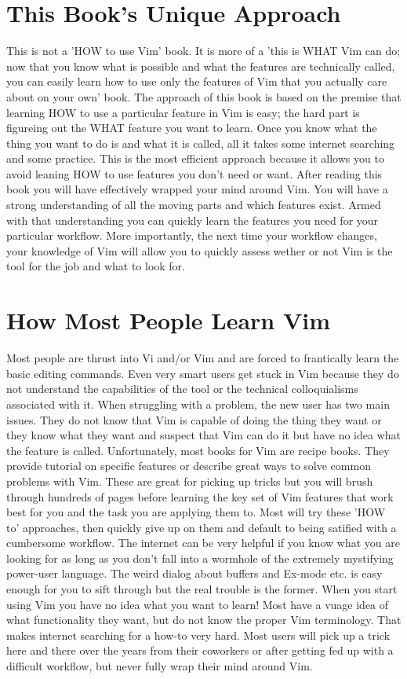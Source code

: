\documentclass[12pt]{book}
\begin{document}
\section{This Book's Unique Approach}
This is not a 'HOW to use Vim' book.
It is more of a 'this is WHAT Vim can do; now that you know what is possible and what the features are technically called, you can easily learn how to use only the features of Vim
that you actually care about on your own' book.
The approach of this book is based on the premise that learning HOW to use a particular feature in Vim is easy; the hard part is figureing out the WHAT feature you want to learn.
Once you know what the thing you want to do is and what it is called, all it takes some internet searching and some practice.
This is the most efficient approach because it allows you to avoid leaning HOW to use features you don't need or want.
After reading this book you will have effectively wrapped your mind around Vim.
You will have a strong understanding of all the moving parts and which features exist.
Armed with that understanding you can quickly learn the features you need for your particular workflow.
More importantly, the next time your workflow changes, your knowledge of Vim will allow you to quickly assess wether or not Vim is the tool for the job and what to look for.

\section{How Most People Learn Vim}
Most people are thrust into Vi and/or Vim and are forced to frantically learn the basic editing commands.
Even very smart users get stuck in Vim because they do not understand the capabilities of the tool or the technical colloquialisms associated with it.
When struggling with a problem, the new user has two main issues.
They do not know that Vim is capable of doing the thing they want or they know what they want and suspect that Vim can do it but have no idea what the feature is called.
Unfortunately, most books for Vim are recipe books.
They provide tutorial on specific features or describe great ways to solve common problems with Vim.
These are great for picking up tricks but you will brush through hundreds of pages before learning the key set of Vim features that work best for you and the task you are applying them to.
Most will try these 'HOW to' approaches, then quickly give up on them and default to being satified with a cumbersome workflow.
The internet can be very helpful if you know what you are looking for as long as you don't fall into a wormhole of the extremely mystifying power-user language.
The weird dialog about buffers and Ex-mode etc. is easy enough for you to sift through but the real trouble is the former.
When you start using Vim you have no idea what you want to learn!
Most have a vuage idea of what functionality they want, but do not know the proper Vim terminology.
That makes internet searching for a how-to very hard.
Most users will pick up a trick here and there over the years from their coworkers or after getting fed up with a difficult workflow, but never fully wrap their mind around Vim.
\end{document}
